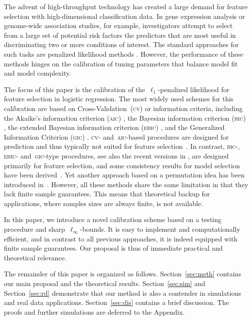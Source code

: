 \documentclass{elsarticle}
\newcommand{\oldnew}{}
\def\AIC{\textsc{aic}}
\def\BIC{\textsc{bic}}
\def\EBIC{\textsc{ebic}}
\def\GIC{\textsc{gic}}
\def\CV{\textsc{cv}}
\begin{document}
The advent of high-throughput technology has created a large demand for feature selection with high-dimensional classification data.
In gene expression analysis or genome-wide association studies, for example, investigators attempt to select from a large set of potential risk factors the predictors that are most useful in discriminating two or more conditions of interest.  The standard approaches for such tasks  are penalized likelihood methods \citep{buhlmann2011statistics,hastie2015statistical, bunea2008honest,ravikumar2010high,ryali2010sparse,Wu09}.
However, the performance of these methods hinges on the calibration of tuning parameters that balance  model fit and model complexity.

The focus of this paper is the calibration of the~$\ell_1$-penalized likelihood for feature selection in logistic regression.
 The most widely used schemes for this calibration are based on Cross-Validation~(\CV) \citep{stone1974cross} or information criteria, including the Akaike's information criterion (\AIC) \citep{akaike1973information}, the Bayesian information criterion (\BIC) \citep{schwarz1978estimating}, {\oldnew the extended Bayesian information criterion (\EBIC) \citep{chen2012extended},} {and the Generalized Information Criterion (\GIC) \citep{nishii1984asymptotic}}.
 \CV- and~\AIC-based procedures are designed for prediction and  thus typically not suited for feature selection~\citep{shao1993linear}.  In contrast, \BIC-{\oldnew, \EBIC-} and~\GIC-type procedures, see also the recent versions in \citep{wang2007tuning,chen2012extended},  are designed primarily for feature selection, and some consistency results for model selection have been derived~\citep{Fan13,Zhang10}.  Yet another approach based on a permutation idea has been introduced in~\citep{sabourin2015permutation}. However, all these methods share the same limitation in that they lack finite sample guarantees. This means that theoretical backup for applications, where samples sizes are always finite, is not available.

 In this paper, we introduce a novel calibration scheme based on a testing procedure and  sharp~$\ell_{\infty}$-bounds. It is easy to implement and computationally efficient, and in contrast to all previous approaches, it is indeed equipped with finite sample guarantees. Our proposal is thus of immediate practical and theoretical relevance.



The remainder of this paper is organized as follows. Section~\ref{sec:meth} contains our main proposal and the theoretical results. Section~\ref{sec:sim} and Section~\ref{sec:rd} demonstrate that our method is also a contender in simulations and real data applications. Section~\ref{sec:dis} contains  a brief discussion. The proofs and further simulations are deferred to the Appendix.
\end{document}
